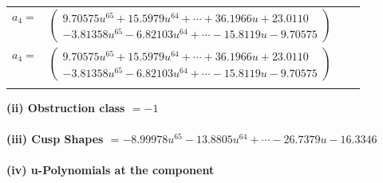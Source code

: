 \documentclass[1p]{elsarticle_modified}
\theoremstyle{definition}
\begin{document}
\begin{tabular}{m{7pt} m{180pt} m{7pt} m{180pt} }
\flushright $a_{4}=$&$\begin{pmatrix}9.70575 u^{65}+15.5979 u^{64}+\cdots+36.1966 u+23.0110\\-3.81358 u^{65}-6.82103 u^{64}+\cdots-15.8119 u-9.70575\end{pmatrix}$\\ \flushright $a_{4}=$&$\begin{pmatrix}9.70575 u^{65}+15.5979 u^{64}+\cdots+36.1966 u+23.0110\\-3.81358 u^{65}-6.82103 u^{64}+\cdots-15.8119 u-9.70575\end{pmatrix}$\\&\end{tabular}
\flushleft \textbf{(ii) Obstruction class $= -1$}\\~\\
\flushleft \textbf{(iii) Cusp Shapes $= -8.99978 u^{65}-13.8805 u^{64}+\cdots-26.7379 u-16.3346$}\\~\\
\newpage\renewcommand{\arraystretch}{1}
\flushleft \textbf{(iv) u-Polynomials at the component}\newline \\
\end{document}

